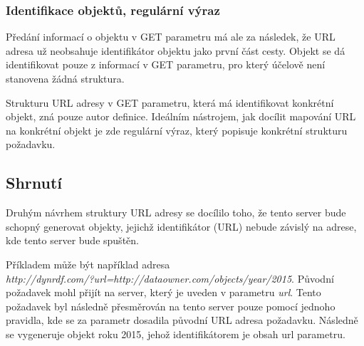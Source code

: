 \documentclass[thesis=B,czech]{FITthesis}[2012/06/26]
\begin{document}
  \subsubsection{Identifikace objektů, regulární výraz}
   Předání informací o objektu v GET parametru má ale za následek, že URL adresa už neobsahuje identifikátor objektu jako první část cesty. Objekt se dá identifikovat 
   pouze z informací v GET parametru, pro který účelově není stanovena žádná struktura.
   
   Strukturu URL adresy v GET parametru, která má identifikovat konkrétní objekt, zná pouze autor definice. Ideálním nástrojem, jak docílit mapování URL na konkrétní
   objekt je zde regulární výraz, který popisuje konkrétní strukturu požadavku.
   
\subsection{Shrnutí}
   Druhým návrhem struktury URL adresy se docílilo toho, že tento server bude schopný generovat objekty, jejichž identifikátor (URL) nebude závislý na adrese, kde tento
   server bude spuštěn.
   
   Příkladem může být například adresa \\ \textit{http://dynrdf.com/?url=http://dataowner.com/objects/year/2015}. Původní požadavek mohl přijít na server, 
   který je uveden v parametru \textit{url}. Tento požadavek byl následně přesměrován na tento server pouze pomocí jednoho pravidla, kde se za parametr dosadila 
   původní URL adresa požadavku. Následně se vygeneruje objekt roku 2015, jehož identifikátorem je obsah url parametru.

   \newpage
   
\end{document}
